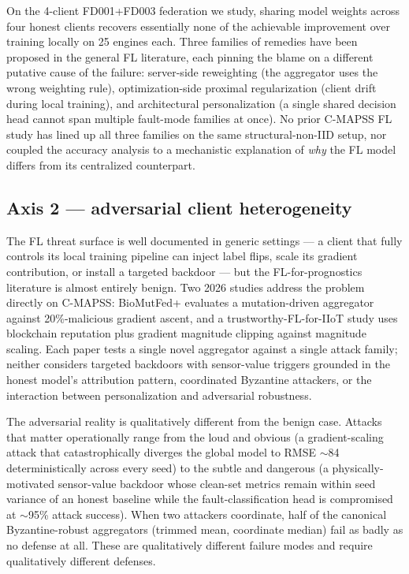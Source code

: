 \documentclass[preprint,12pt,authoryear]{elsarticle}
\begin{document}
On the 4-client FD001+FD003 federation we study, sharing model
weights across four honest clients recovers essentially none of the
achievable improvement over training locally on 25 engines each.
Three families of remedies have been proposed in the general FL
literature, each pinning the blame on a different putative cause of
the failure: server-side reweighting (the aggregator uses the wrong
weighting rule), optimization-side proximal regularization (client
drift during local training), and architectural personalization
(a single shared decision head cannot span multiple fault-mode
families at once). No prior C-MAPSS FL study has lined up all three
families on the same structural-non-IID setup, nor coupled the
accuracy analysis to a mechanistic explanation of \emph{why} the FL
model differs from its centralized counterpart.

\subsection{Axis 2 --- adversarial client heterogeneity}
\label{subsec:axis2-intro}

The FL threat surface is well documented in generic settings --- a
client that fully controls its local training pipeline can inject
label flips, scale its gradient contribution, or install a targeted
backdoor --- but the FL-for-prognostics literature is almost
entirely benign. Two 2026 studies address the problem directly on
C-MAPSS: BioMutFed+ \citep{Tallat2026BioMutFedPlus} evaluates a
mutation-driven aggregator against 20\%-malicious gradient ascent,
and a trustworthy-FL-for-IIoT study \citep{Li2026TrustworthyFLIIoT}
uses blockchain reputation plus gradient magnitude clipping against
magnitude scaling. Each paper tests a single novel aggregator
against a single attack family; neither considers targeted
backdoors with sensor-value triggers grounded in the honest model's
attribution pattern, coordinated Byzantine
attackers, or the interaction between personalization and
adversarial robustness.

The adversarial reality is qualitatively different from the benign
case. Attacks that matter operationally range from the loud and
obvious (a gradient-scaling attack that catastrophically diverges
the global model to RMSE $\sim$84 deterministically across every
seed) to the subtle and dangerous (a physically-motivated
sensor-value backdoor whose clean-set metrics remain within seed
variance of an honest baseline while the
fault-classification head is compromised at $\sim$95\% attack
success). When two attackers coordinate, half of the canonical
Byzantine-robust aggregators (trimmed mean, coordinate median) fail
as badly as no defense at all. These are qualitatively different
failure modes and require qualitatively different defenses.
\end{document}
